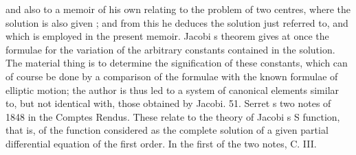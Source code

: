 \documentclass[11pt,a4paper]{book}
\begin{document}
and
also
to
a
memoir
of
his own
relating
to
the problem
of two
centres, where the
solution
is also given
;
and
from
this
he
deduces
the
solution
just
referred
to,
and
which
is employed
in
the
present
memoir.
Jacobi s
theorem
gives
at
once
the
formulae
for
the
variation
of
the
arbitrary
constants
contained
in
the
solution.
The
material
thing
is
to
determine the
signification
of
these
constants,
which
can
of
course
be
done by
a
comparison
of
the
formulae
with
the
known
formulae
of
elliptic
motion;
the
author
is
thus
led
to
a
system
of
canonical
elements
similar
to,
but
not
identical
with,
those
obtained
by
Jacobi.
51.
Serret s two
notes of 1848 in the Comptes Rendus.
These relate to the theory
of Jacobi s S
function,
that
is,
of the
function considered
as
the
complete
solution of
a
given
partial
differential
equation
of the
first
order.
In
the
first
of
the
two
notes,
C.
III.

\end{document}
